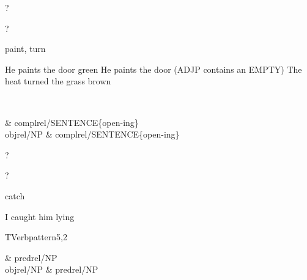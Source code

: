 \begin{thetadescr}
\evitem ?
\esitem
     \begin{examples}
        \example ?
     \end{examples}
\end{thetadescr}



\begin{thetadescr}
\evitem paint, turn
\esitem
     \begin{examples}
        \example He paints the door green
        \example He paints the door  (ADJP contains an EMPTY)
        \example The heat turned the grass brown
     \end{examples}
\end{thetadescr}


\newpage
{}
\begin{vpattern}
 \norule
\csritem \mbox{}\\
     \begin{csr}
               & complrel/SENTENCE\{open-ing\} \\
     objrel/NP & complrel/SENTENCE\{open-ing\} 
     \end{csr}
\remarksitem
\end{vpattern}


\begin{thetadescr}
\evitem ?
\esitem
     \begin{examples}
        \example ?
     \end{examples}
\end{thetadescr}



\begin{thetadescr}
\evitem catch
\esitem
     \begin{examples}
        \example I caught him lying
     \end{examples}
\end{thetadescr}


\newpage
{}
\begin{vpattern}
 TVerbpattern5,2   
\csritem \mbox{}\\
     \begin{csr}
                & predrel/NP\\
      objrel/NP & predrel/NP
     \end{csr}

\remarksitem
\end{vpattern}

